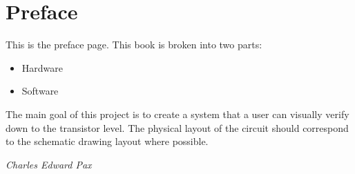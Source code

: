 \chapter*{Preface}

This is the preface page. This book is broken into two parts:

\begin{itemize}
	\item Hardware
	\item Software
\end{itemize}

The main goal of this project is to create a system that a user can visually verify down
to the transistor level. The physical layout of the circuit should correspond to the
schematic drawing layout where possible.

\begin{flushright}
	\textit{Charles Edward Pax}
\end{flushright}
